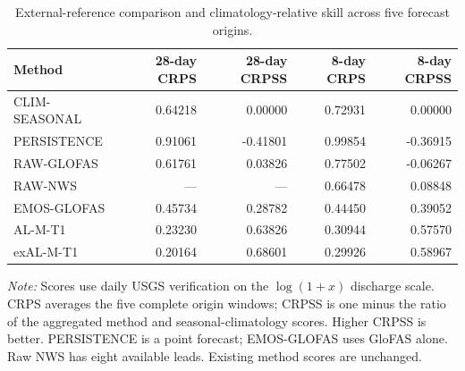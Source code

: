 \begin{table}[!htbp]
\centering
\begin{threeparttable}
\caption{External-reference comparison and climatology-relative skill across five forecast origins.}
\label{tab:comment2_external_comparison}
\fontsize{8.5}{10.5}\selectfont
\begin{tabular}{lrrrr}
\hline
Method & 28-day CRPS & 28-day CRPSS & 8-day CRPS & 8-day CRPSS \\
\hline
CLIM-SEASONAL & 0.64218 & 0.00000 & 0.72931 & 0.00000 \\
PERSISTENCE & 0.91061 & -0.41801 & 0.99854 & -0.36915 \\
RAW-GLOFAS & 0.61761 & 0.03826 & 0.77502 & -0.06267 \\
RAW-NWS & --- & --- & 0.66478 & 0.08848 \\
EMOS-GLOFAS & 0.45734 & 0.28782 & 0.44450 & 0.39052 \\
AL-M-T1 & 0.23230 & 0.63826 & 0.30944 & 0.57570 \\
exAL-M-T1 & 0.20164 & 0.68601 & 0.29926 & 0.58967 \\
\hline
\end{tabular}
\begin{tablenotes}
\fontsize{8}{10}\selectfont
\item \textit{Note:} Scores use daily USGS verification on the $\log(1+x)$ discharge scale. CRPS averages the five complete origin windows; CRPSS is one minus the ratio of the aggregated method and seasonal-climatology scores. Higher CRPSS is better. PERSISTENCE is a point forecast; EMOS-GLOFAS uses GloFAS alone. Raw NWS has eight available leads. Existing method scores are unchanged.
\end{tablenotes}
\end{threeparttable}
\end{table}
